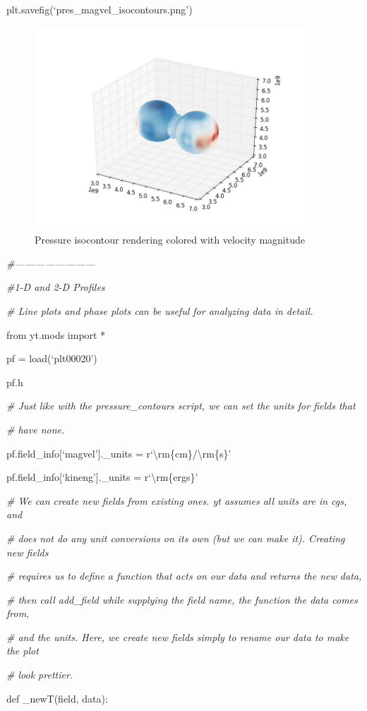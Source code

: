 plt.savefig(`pres\_magvel\_isocontours.png')
\begin{figure}[h]
\centering
\includegraphics[width=4in]{Visualization/isocontours}
\caption{Pressure isocontour rendering colored with velocity magnitude}
\end{figure}

{\it\#------------------------}

{\it\#1-D and 2-D Profiles}
{\setlength{\parskip}{0pt}

{\it\# Line plots and phase plots can be useful for analyzing data in detail.}

from yt.mods import *
}

pf = load(`plt00020')

pf.h

{\it\# Just like with the pressure\_contours script, we can set the units for fields that}
{\setlength{\parskip}{0pt}

{\it\# have none.}

pf.field\_info[`magvel'].\_units = r`\textbackslash rm\{cm\}/\textbackslash rm\{s\}'
}

pf.field\_info[`kineng'].\_units = r`\textbackslash rm\{ergs\}'

{\it\# We can create new fields from existing ones. yt assumes all units are in cgs, and}
{\setlength{\parskip}{0pt}

{\it\# does not do any unit conversions on its own (but we can make it). Creating new fields}

{\it\#  requires us to define a function that acts on our data and returns the new data,}

{\it\# then call add\_field while supplying the field name, the function the data comes from,}

{\it\# and the units. Here, we create new fields simply to rename our data to make the plot}

{\it\# look prettier.}

def \_newT(field, data):
}

